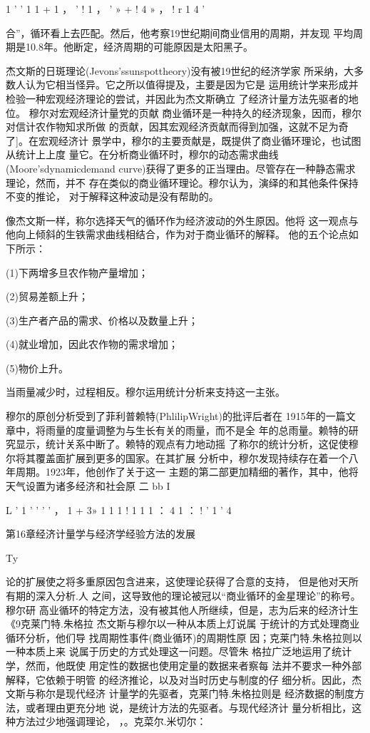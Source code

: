 1
'
'
1
1
+
1
，
'
!
1
，
'
»
+
!
4
»
，
!
r
1
4
'

合”，循环看上去匹配。然后，他考察19世纪期间商业信用的周期，并友现
平均周期是10.8年。他断定，经济周期的可能原因是太阳黑子。

杰文斯的日斑理论(Jevons’ssunspottheory)没有被19世纪的经济学家
所采纳，大多数人认为它相当怪异。它之所以值得提及，主要是因为它是
运用统计学来形成并检验一种宏观经济理论的尝试，并因此为杰文斯确立
了经济计量方法先驱者的地位。
穆尔对宏观经济计量党的页献
商业循环是一种持久的经济现象，因而，穆尔对信计农作物知求所做
的贡献，因其宏观经济贡献而得到加强，这就不足为奇了]。在宏观经济计
景学中，穆尔的主要贡献是，既提供了商业循环理论，也试图从统计上上度
量它。在分析商业循环时，穆尔的动态需求曲线(Moore’sdynamicdemand
curve)获得了更多的正当理由。尽管存在一种静态需求理论，然而，并不
存在类似的商业循环理论。穆尔认为，演绎的和其他条件保持不变的推论，
对于解释这种波动是没有帮助的。

像杰文斯一样，称尔选择天气的循环作为经济波动的外生原因。他将
这一观点与他向上倾斜的生铁需求曲线相结合，作为对于商业循环的解释。
他的五个论点如下所示：

(1)下两增多旦农作物产量增加；

(2)贸易差额上升；

(3)生产者产品的需求、价格以及数量上升；

(4)就业增加，因此农作物的需求增加；

(5)物价上升。

当雨量减少时，过程相反。穆尔运用统计分析来支持这一主张。

穆尔的原创分析受到了菲利普赖特(PhlilipWright)的批评后者在
1915年的一篇文章中，将雨量的度量调整为与生长有关的雨量，而不是全
年的总雨量。赖特的研究显示，统计关系中断了。赖特的观点有力地动摇
了称尔的统计分析，这促使穆尔将其覆盖面扩展到更多的国家。在其扩展
分析中，穆尔发现持续存在着一个八年周期。1923年，他创作了关于这一
主题的第二部更加精细的著作，其中，他将天气设置为诸多经济和社会原
二
bb
I

L
’
1
'
'
'
'
，
1
+
3»
1
1
1
!
1
1
1
：
4
1
：
!
'
1
'
4


第16章经济计量学与经济学经验方法的发展


Ty

论的扩展使之将多重原因包含进来，这使理论获得了合意的支持，
但是他对天所有期的深入分析.人
之间，这导致他的理论被冠以“商业循环的金星理论”的称号。穆尔研
高业循环的特定方法，没有被其他人所继续，但是，志为后来的经济计生
《9克莱门特.朱格拉
杰文斯与穆尔以一种从本质上灯说属
于统计的方式处理商业循环分析，他们导
找周期性事件(商业循环)的周期性原
因；克莱门特.朱格拉则以一种本质上来
说属于历史的方式处理这一问题。尽管朱
格拉广泛地运用了统计学，然而，他既使
用定性的数据也使用定量的数据来者察每
法并不要求一种外部解释，它依赖于明管
的经济推论，以及对当时历史与制度的仔
细分析。因此，杰文斯与称尔是现代经济
计量学的先驱者，克莱门特.朱格拉则是
经济数据的制度方法，或者理由更充分地
说，是统计方法的先驱者。与现代经济计
量分析相比，这种方法过少地强调理论，
，。克菜尔.米切尔：

